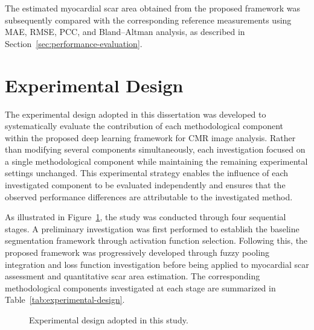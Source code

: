 The estimated myocardial scar area obtained from the proposed framework was subsequently compared with the corresponding reference measurements using MAE, RMSE, PCC, and Bland--Altman analysis, as described in Section~\ref{sec:performance-evaluation}.

\section{Experimental Design}
\label{sec:experimental-design}

The experimental design adopted in this dissertation was developed to systematically evaluate the contribution of each methodological component within the proposed deep learning framework for CMR image analysis. Rather than modifying several components simultaneously, each investigation focused on a single methodological component while maintaining the remaining experimental settings unchanged. This experimental strategy enables the influence of each investigated component to be evaluated independently and ensures that the observed performance differences are attributable to the investigated method.

As illustrated in Figure~\ref{fig:ch3-experimental-design}, the study was conducted through four sequential stages. A preliminary investigation was first performed to establish the baseline segmentation framework through activation function selection. Following this, the proposed framework was progressively developed through fuzzy pooling integration and loss function investigation before being applied to myocardial scar assessment and quantitative scar area estimation. The corresponding methodological components investigated at each stage are summarized in Table~\ref{tab:experimental-design}.

\begin{figure}[htbp]
\centering
{}
\caption{Experimental design adopted in this study.}
\label{fig:ch3-experimental-design}
\end{figure}

